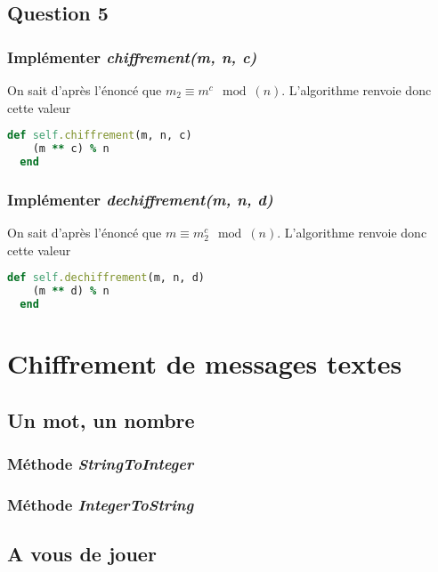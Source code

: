 \documentclass[a4paper,10pt]{article}
\begin{document}
\clearpage
\subsection{Question 5}
\subsubsection{Implémenter \textit{chiffrement(m, n, c)}}
On sait d'après l'énoncé que $m_2 \equiv m^c \mod(n)$. L'algorithme renvoie donc cette valeur\\
\begin{lstlisting}[language=Ruby]
  def self.chiffrement(m, n, c)
    (m ** c) % n
  end
\end{lstlisting}

\subsubsection{Implémenter \textit{dechiffrement(m, n, d)}}
On sait d'après l'énoncé que $m \equiv m_2^c \mod(n)$. L'algorithme renvoie donc cette valeur\\
\begin{lstlisting}[language=Ruby]
  def self.dechiffrement(m, n, d)
    (m ** d) % n
  end
\end{lstlisting}

\clearpage
\section{Chiffrement de messages textes}
\subsection{Un mot, un nombre}
\subsubsection{Méthode \textit{StringToInteger}}
\subsubsection{Méthode \textit{IntegerToString}}

\clearpage
\subsection{A vous de jouer}
\end{document}
